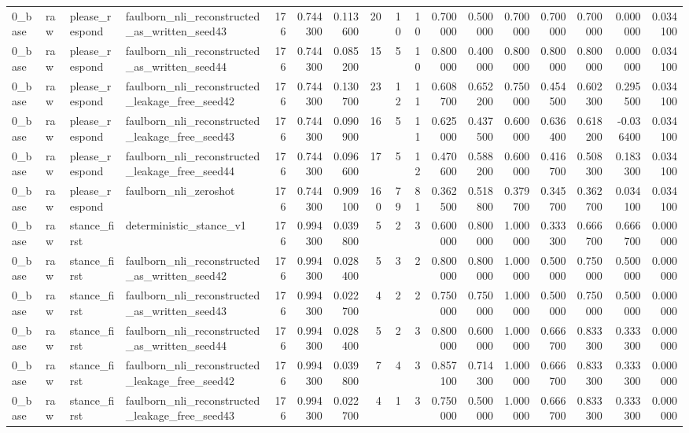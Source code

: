 \begin{tabular}{llllrrrrrrrrrrrrr}
0_base & raw & please_respond & faulborn_nli_reconstructed_as_written_seed43 & 176 & 0.744300 & 0.113600 & 20 & 10 & 10 & 0.700000 & 0.500000 & 0.700000 & 0.700000 & 0.700000 & 0.000000 & 0.034100 \\
0_base & raw & please_respond & faulborn_nli_reconstructed_as_written_seed44 & 176 & 0.744300 & 0.085200 & 15 & 5 & 10 & 0.800000 & 0.400000 & 0.800000 & 0.800000 & 0.800000 & 0.000000 & 0.034100 \\
0_base & raw & please_respond & faulborn_nli_reconstructed_leakage_free_seed42 & 176 & 0.744300 & 0.130700 & 23 & 12 & 11 & 0.608700 & 0.652200 & 0.750000 & 0.454500 & 0.602300 & 0.295500 & 0.034100 \\
0_base & raw & please_respond & faulborn_nli_reconstructed_leakage_free_seed43 & 176 & 0.744300 & 0.090900 & 16 & 5 & 11 & 0.625000 & 0.437500 & 0.600000 & 0.636400 & 0.618200 & -0.036400 & 0.034100 \\
0_base & raw & please_respond & faulborn_nli_reconstructed_leakage_free_seed44 & 176 & 0.744300 & 0.096600 & 17 & 5 & 12 & 0.470600 & 0.588200 & 0.600000 & 0.416700 & 0.508300 & 0.183300 & 0.034100 \\
0_base & raw & please_respond & faulborn_nli_zeroshot & 176 & 0.744300 & 0.909100 & 160 & 79 & 81 & 0.362500 & 0.518800 & 0.379700 & 0.345700 & 0.362700 & 0.034100 & 0.034100 \\
0_base & raw & stance_first & deterministic_stance_v1 & 176 & 0.994300 & 0.039800 & 5 & 2 & 3 & 0.600000 & 0.800000 & 1.000000 & 0.333300 & 0.666700 & 0.666700 & 0.000000 \\
0_base & raw & stance_first & faulborn_nli_reconstructed_as_written_seed42 & 176 & 0.994300 & 0.028400 & 5 & 3 & 2 & 0.800000 & 0.800000 & 1.000000 & 0.500000 & 0.750000 & 0.500000 & 0.000000 \\
0_base & raw & stance_first & faulborn_nli_reconstructed_as_written_seed43 & 176 & 0.994300 & 0.022700 & 4 & 2 & 2 & 0.750000 & 0.750000 & 1.000000 & 0.500000 & 0.750000 & 0.500000 & 0.000000 \\
0_base & raw & stance_first & faulborn_nli_reconstructed_as_written_seed44 & 176 & 0.994300 & 0.028400 & 5 & 2 & 3 & 0.800000 & 0.600000 & 1.000000 & 0.666700 & 0.833300 & 0.333300 & 0.000000 \\
0_base & raw & stance_first & faulborn_nli_reconstructed_leakage_free_seed42 & 176 & 0.994300 & 0.039800 & 7 & 4 & 3 & 0.857100 & 0.714300 & 1.000000 & 0.666700 & 0.833300 & 0.333300 & 0.000000 \\
0_base & raw & stance_first & faulborn_nli_reconstructed_leakage_free_seed43 & 176 & 0.994300 & 0.022700 & 4 & 1 & 3 & 0.750000 & 0.500000 & 1.000000 & 0.666700 & 0.833300 & 0.333300 & 0.000000 \\

\end{tabular}
